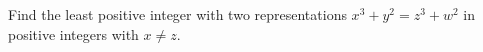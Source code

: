 Find the least positive integer with two representations $x^3+y^2=z^3+w^2$ in positive integers with $x\ne z$.
